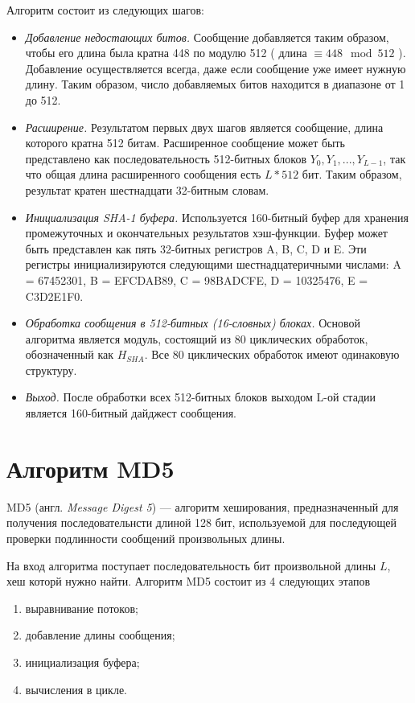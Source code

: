 Алгоритм состоит из следующих шагов:
\begin{itemize}
	\item \textit{Добавление недостающих битов.} Сообщение добавляется таким образом, чтобы его длина была кратна 448 по модулю 512 ( длина $\equiv  448 \mod 512$ ). Добавление осуществляется всегда, даже если сообщение уже имеет нужную длину. Таким образом, число добавляемых битов находится в диапазоне от 1 до 512.
	\item \textit{Расширение.} Результатом первых двух шагов является сообщение, длина которого кратна 512 битам. Расширенное сообщение может быть представлено как последовательность 512-битных блоков $Y_0, Y_1, . . . , Y_{L-1}$, так что общая длина расширенного сообщения есть $L * 512$ бит. Таким образом, результат кратен шестнадцати 32-битным словам.
	\item \textit{Инициализация SHA-1 буфера.} Используется 160-битный буфер для хранения промежуточных и окончательных результатов хэш-функции. Буфер может быть представлен как пять 32-битных регистров A, B, C, D и E. Эти регистры инициализируются следующими шестнадцатеричными числами: A = 67452301, B = EFCDAB89, C = 98BADCFE, D = 10325476, E = C3D2E1F0.
	\item \textit{Обработка сообщения в 512-битных (16-словных) блоках.} Основой алгоритма является модуль, состоящий из 80 циклических обработок, обозначенный как $H_{SHA}$. Все 80 циклических обработок имеют одинаковую структуру.
	\item \textit{Выход.} После обработки всех 512-битных блоков выходом L-ой стадии является 160-битный дайджест сообщения.
\end{itemize}

\section{Алгоритм MD5}

MD5 (англ. \textit{Message Digest 5}) --- алгоритм хеширования, предназначенный для получения последовательнсти длиной 128 бит, используемой для последующей проверки подлинности сообщений произвольных длины.

На вход алгоритма поступает последовательность бит произвольной длины $L$, хеш которй нужно найти. 
Алгоритм MD5 состоит из 4 следующих этапов
\begin{enumerate}[label=\arabic*)]
	\item выравнивание потоков;
	\item добавление длины сообщения;
	\item инициализация буфера;
	\item вычисления в цикле.
\end{enumerate}

